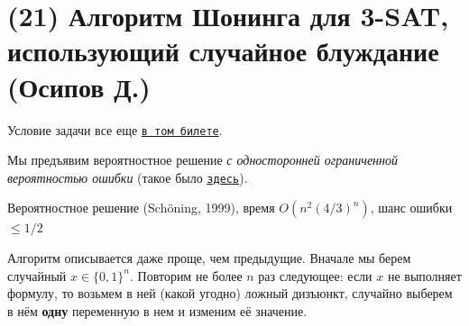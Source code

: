 \section{(21) Алгоритм Шонинга для 3-SAT, использующий случайное блуждание (Осипов Д.)}

Условие задачи все еще \hyperlink{3sat}{\texttt{в том билете}}.

Мы предъявим вероятностное решение \textit{с односторонней ограниченной вероятностью ошибки} (такое было \hyperlink{Freivalds}{\texttt{здесь}}).

\begin{algodescription}{Вероятностное решение (Sch\"oning, 1999), время $O(n^2(4/3)^n)$, шанс ошибки $\leq 1/2$ }

Алгоритм описывается даже проще, чем предыдущие. Вначале мы берем случайный $x \in \{0, 1\}^n$. Повторим не более $n$ раз следующее: если $x$ не выполняет формулу, то возьмем в ней (какой угодно) ложный дизъюнкт, случайно выберем в нём \textbf{одну} переменную в нем и изменим её значение.
\end{algodescription}

